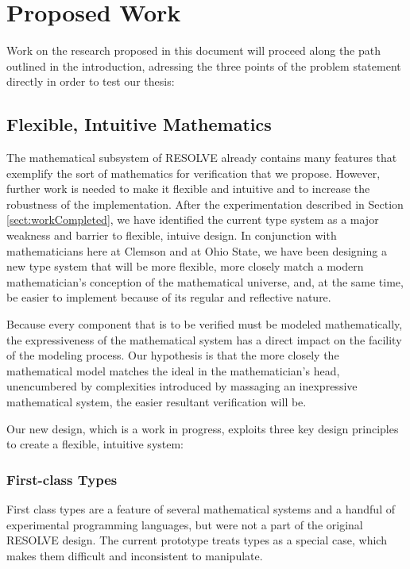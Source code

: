 \section{Proposed Work}\label{sect:proposedWork}
Work on the research proposed in this document will proceed along the path outlined in the introduction, adressing the three points of the problem statement directly in order to test our thesis:

\subsection{Flexible, Intuitive Mathematics}
The mathematical subsystem of RESOLVE already contains many features that exemplify the sort of mathematics for verification that we propose.  However, further work is needed to make it flexible and intuitive and to increase the robustness of the implementation.  After the experimentation described in Section \ref{sect:workCompleted}, we have identified the current type system as a major weakness and barrier to flexible, intuive design.  In conjunction with mathematicians here at Clemson and at Ohio State, we have been designing a new type system that will be more flexible, more closely match a modern mathematician's conception of the mathematical universe, and, at the same time, be easier to implement because of its regular and reflective nature.

Because every component that is to be verified must be modeled mathematically, the expressiveness of the mathematical system has a direct impact on the facility of the modeling process.  Our hypothesis is that the more closely the mathematical model matches the ideal in the mathematician's head, unencumbered by complexities introduced by massaging an inexpressive mathematical system, the easier resultant verification will be. 

Our new design, which is a work in progress, exploits three key design principles to create a flexible, intuitive system:

\subsubsection{First-class Types}\label{subsubsect:firstClassTypes}
First class types are a feature of several mathematical systems and a handful of experimental programming languages, but were not a part of the original RESOLVE design.  The current prototype treats types as a special case, which makes them difficult and inconsistent to manipulate.  


